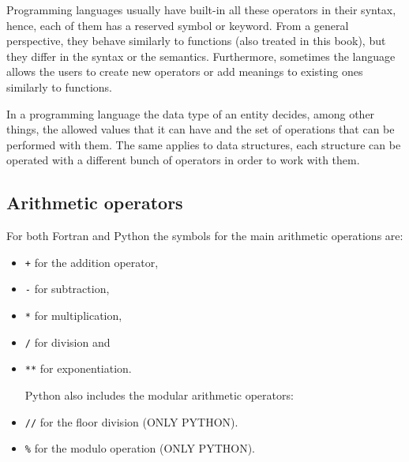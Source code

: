 Programming languages usually have built-in all these operators in their syntax,
hence, each of them has a reserved symbol or keyword.
From a general perspective, 
they behave similarly to functions (also treated in this book), 
but they differ in the syntax or the semantics. 
Furthermore, sometimes the language allows the users to create new operators 
or add meanings to existing ones similarly to functions. 

In a programming language the data type of an entity decides, among other things, 
the allowed values that it can have and 
the set of operations that can be performed with them.
The same applies to data structures, each structure can be operated 
with a different bunch of operators in order to work with them. 

%

        \subsection*{Arithmetic operators}
        \vspace{-0.5cm}
        For both Fortran and Python the symbols for the main arithmetic operations are:
        \vspace{-0.7cm}
        \begin{itemize}[noitemsep]
            \item \texttt{+} for the addition operator, 
            \item \texttt{-} for subtraction,
            \item \texttt{*} for multiplication,
            \item \texttt{/} for division and
            \item \texttt{**} for exponentiation.
            
            \vspace{0.3cm}
            Python also includes the modular arithmetic operators:
            \item \texttt{//} for the floor division (ONLY PYTHON).
            \item \texttt{\%} for the modulo operation (ONLY PYTHON).
        \end{itemize}
        
